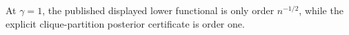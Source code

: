 At \(\gamma=1\), the published displayed lower functional is only order \(n^{-1/2}\), while the explicit clique-partition posterior certificate is order one.